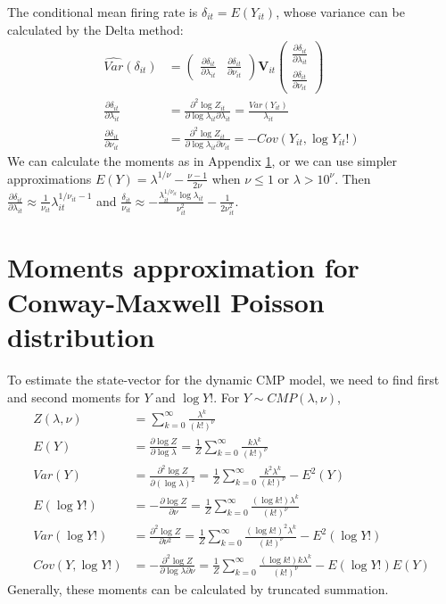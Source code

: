 \documentclass[aoas]{imsart}
\theoremstyle{plain}
\theoremstyle{remark}
\begin{document}
\begin{appendix}
The conditional mean firing rate is $\delta_{it} = E(Y_{it})$, whose variance can be calculated by the Delta method:
\begin{align}
	\widehat{Var}(\delta_{it}) &=  \begin{pmatrix}
		\frac{\partial\delta_{it}}{\partial\lambda_{it}} & \frac{\partial\delta_{it}}{\partial\nu_{it}} 
	\end{pmatrix}\bm{V}_{it}\begin{pmatrix}
	\frac{\partial\delta_{it}}{\partial\lambda_{it}} \\ \frac{\partial\delta_{it}}{\partial\nu_{it}}
\end{pmatrix}\\
\frac{\partial\delta_{it}}{\partial\lambda_{it}} &= \frac{\partial^2\log Z_{it}}{\partial\log\lambda_{it}\partial\lambda_{it}} = \frac{Var(Y_{it})}{\lambda_{it}}\\
\frac{\partial\delta_{it}}{\partial\nu_{it}} &= \frac{\partial^2\log Z_{it}}{\partial\log\lambda_{it}\partial\nu_{it}} = -Cov(Y_{it}, \log Y_{it}!)
\end{align}
We can calculate the moments as in Appendix \ref{appB}, or we can use simpler approximations $E(Y) = \lambda^{1/\nu} - \frac{\nu-1}{2\nu}$ when $\nu\leq 1$ or $\lambda > 10^\nu$. Then $\frac{\partial\delta_{it}}{\partial\lambda_{it}}\approx\frac{1}{\nu_{it}}\lambda_{it}^{1/\nu_{it} - 1}$ and $\frac{\delta_{it}}{\nu_{it}} \approx -\frac{\lambda_{it}^{1/\nu_{it}}\log \lambda_{it}}{\nu_{it}^2} - \frac{1}{2\nu_{it}^2}$.

\section{Moments approximation for Conway-Maxwell Poisson distribution}\label{appB}
To estimate the state-vector for the dynamic CMP model, we need to find first and second moments for $Y$ and $\log Y!$. For $Y\sim CMP(\lambda, \nu)$,
\begin{align}
	Z(\lambda, \nu) &= \sum_{k=0}^{\infty}\frac{\lambda^k}{(k!)^\nu}\\
	E(Y) &= \frac{\partial\log Z}{\partial \log\lambda} = \frac{1}{Z}\sum_{k=0}^{\infty}\frac{k\lambda^k}{(k!)^\nu} \nonumber\\
	Var(Y) &= \frac{\partial^2\log Z}{\partial(\log \lambda)^2} = \frac{1}{Z}\sum_{k=0}^{\infty}\frac{k^2\lambda^k}{(k!)^\nu} - E^2(Y) \nonumber\\
	E(\log Y!) &= -\frac{\partial\log Z}{\partial\nu} = \frac{1}{Z}\sum_{k=0}^{\infty}\frac{(\log k!)\lambda^k}{(k!)^\nu} \nonumber\\
	Var(\log Y!) &= \frac{\partial^2\log Z}{\partial \nu^2} = \frac{1}{Z}\sum_{k=0}^{\infty}\frac{(\log k!)^2\lambda^k}{(k!)^\nu} - E^2(\log Y!) \nonumber\\
	Cov(Y, \log Y!) &= -\frac{\partial^2\log Z}{\partial \log\lambda\partial\nu} = \frac{1}{Z}\sum_{k=0}^{\infty}\frac{(\log k!) k\lambda^k}{(k!)^\nu} - E(\log Y!)E(Y) \nonumber
\end{align}
Generally, these moments can be calculated by truncated summation.


\end{appendix}
\end{document}

